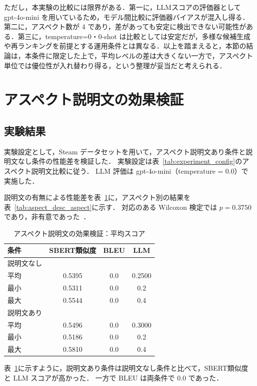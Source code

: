 ただし，本実験の比較には限界がある．第一に，LLMスコアの評価器として gpt-4o-mini を用いているため，モデル間比較に評価器バイアスが混入し得る．第二に，アスペクト数が 4 であり，差があっても安定に検出できない可能性がある．第三に，temperature=0・0-shot は比較としては安定だが，多様な候補生成や再ランキングを前提とする運用条件とは異なる．以上を踏まえると，本節の結論は，本条件に限定した上で，平均レベルの差は大きくない一方で，アスペクト単位では優位性が入れ替わり得る，という整理が妥当だと考えられる．

\section{アスペクト説明文の効果検証}
\subsection{実験結果}
実験設定として，Steam データセットを用いて，アスペクト説明文あり条件と説明文なし条件の性能差を検証した．
実験設定は表~\ref{tab:experiment_config}のアスペクト説明文比較に従う．
LLM 評価は gpt-4o-mini（temperature = 0.0）で実施した．

説明文の有無による性能差を表~\ref{tab:aspect_desc_summary}に，アスペクト別の結果を表~\ref{tab:aspect_desc_aspect}に示す．
対応のある Wilcoxon 検定では \(p=0.3750\) であり，非有意であった~\cite{wilcoxon1945individual}．
\begin{table}[htbp]
  \centering
  \caption{アスペクト説明文の効果検証：平均スコア}
  \label{tab:aspect_desc_summary}
  \begin{tabular}{lccc}
    \toprule
    条件 & SBERT類似度 & BLEU & LLM \\
    \midrule
    説明文なし & & & \\
    \quad 平均 & 0.5395 & 0.0 & 0.2500 \\
    \quad 最小 & 0.5311 & 0.0 & 0.2 \\
    \quad 最大 & 0.5544 & 0.0 & 0.4 \\
    \midrule
    説明文あり & & & \\
    \quad 平均 & 0.5496 & 0.0 & 0.3000 \\
    \quad 最小 & 0.5186 & 0.0 & 0.2 \\
    \quad 最大 & 0.5810 & 0.0 & 0.4 \\
    \bottomrule
  \end{tabular}
\end{table}

表~\ref{tab:aspect_desc_summary}に示すように，説明文あり条件は説明文なし条件と比べて，SBERT類似度と LLM スコアが高かった．
一方で BLEU は両条件で 0.0 であった．

